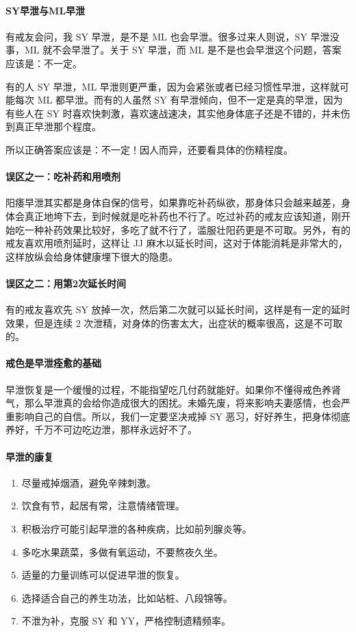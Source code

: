\documentclass[fontset=founder]{ctexart}
\begin{document}
\paragraph{SY早泄与ML早泄}

有戒友会问，我 SY 早泄，是不是 ML 也会早泄。很多过来人则说，SY 早泄没事，ML 就不会早泄了。关于 SY 早泄，而 ML 是不是也会早泄这个问题，答案应该是：不一定。

有的人 SY 早泄，ML 早泄则更严重，因为会紧张或者已经习惯性早泄，这样就可能每次 ML 都早泄。而有的人虽然 SY 有早泄倾向，但不一定是真的早泄，因为有些人在 SY 时喜欢快刺激，喜欢速战速决，其实他身体底子还是不错的，并未伤到真正早泄那个程度。

所以正确答案应该是：不一定！因人而异，还要看具体的伤精程度。

\paragraph{误区之一：吃补药和用喷剂}

阳痿早泄其实都是身体自保的信号，如果靠吃补药纵欲，那身体只会越来越差，身体会真正地垮下去，到时候就是吃补药也不行了。吃过补药的戒友应该知道，刚开始吃一种补药效果比较好，多吃了就不行了，滥服壮阳药更是不可取。另外，有的戒友喜欢用喷剂延时，这样让 JJ 麻木以延长时间，这对于体能消耗是非常大的，这样放纵会给身体健康埋下很大的隐患。

\paragraph{误区之二：用第2次延长时间}

有的戒友喜欢先 SY 放掉一次，然后第二次就可以延长时间，这样是有一定的延时效果，但是连续 2 次泄精，对身体的伤害太大，出症状的概率很高，这是不可取的。

\paragraph{戒色是早泄痊愈的基础}

早泄恢复是一个缓慢的过程，不能指望吃几付药就能好。如果你不懂得戒色养肾气，那么早泄真的会给你造成很大的困扰。未婚先废，将来影响夫妻感情，也会严重影响自己的自信。所以，我们一定要坚决戒掉 SY 恶习，好好养生，把身体彻底养好，千万不可边吃边泄，那样永远好不了。

\paragraph{早泄的康复}

\begin{enumerate}
    \item 尽量戒掉烟酒，避免辛辣刺激。
    \item 饮食有节，起居有常，注意情绪管理。
    \item 积极治疗可能引起早泄的各种疾病，比如前列腺炎等。
    \item 多吃水果蔬菜，多做有氧运动，不要熬夜久坐。
    \item 适量的力量训练可以促进早泄的恢复。
    \item 选择适合自己的养生功法，比如站桩、八段锦等。
    \item 不泄为补，克服 SY 和 YY，严格控制遗精频率。
\end{enumerate}
\end{document}
